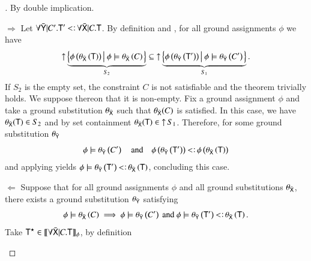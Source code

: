 \documentclass{report}
\begin{document}
  \begin{proof}[]
    By double implication.
    \begin{indcase}{$\Rightarrow$}
      Let $\forall\bar{\type{Y}}|C'.\type{T}'\subtype\forall\bar{\type{X}}|C.\type{T}$.
      By definition  and , for all
      ground assignments $\phi$ we have
      \begin{displaymath}
        \mathop{\rm\uparrow}\nolimits\underbrace{\left\{{\phi\left({\theta_{\bar{\textsf{X}}}\left({\textsf{T}}\right)}\right)}\left|\ {\phi\models\theta_{\bar{\textsf{X}}}\left({C}\right)}\right.\right\}}_{S_2}\subseteq
        \mathop{\rm\uparrow}\nolimits\underbrace{\left\{{\phi\left({\theta_{\bar{\textsf{Y}}}\left({\textsf{T}'}\right)}\right)}\left|\ {\phi\models\theta_{\bar{\textsf{Y}}}\left({C'}\right)}\right.\right\}}_{S_1}\textrm{.}
      \end{displaymath}
      If $S_2$ is the empty set, the constraint $C$ is not satisfiable and the theorem trivially
      holds. We suppose thereon that it is non-empty.
      Fix a ground assignment $\phi$ and take a ground substitution $\theta_{\bar{\textsf{X}}}$
      such that $\theta_{\bar{\textsf{X}}}(C)$ is satisfied. In this case, we have
      $\theta_{\bar{\textsf{X}}}(\textsf{T})\in S_2$ and by set containment
      $\theta_{\bar{\textsf{X}}}(\textsf{T})\in \mathop{\rm\uparrow}\nolimits S_1$. Therefore, for some
      ground substitution $\theta_{\bar{\textsf{Y}}}$
      \begin{displaymath}
        \phi\csat\theta_{\bar{\type{Y}}}\lrp{C'}\quad\textrm{and}\quad
        \phi\lrp{\theta_{\bar{\type{Y}}}\lrp{\type{T}'}}\subtype\phi\lrp{\theta_{\bar{\type{X}}}\lrp{\type{T}}}
      \end{displaymath}
      and applying \csub yields
      $\phi\csat\theta_{\bar{\type{Y}}}\lrp{\type{T}'}\subtype\theta_{\bar{\type{X}}}\lrp{\type{T}}$, concluding this case.
    \end{indcase}
    \begin{indcase}{$\Leftarrow$}
      Suppose that for all ground assignments $\phi$ and all ground substitutions $\theta_{\bar{\textsf{X}}}$, there
      exists a ground substitution $\theta_{\bar{\textsf{Y}}}$ satisfying
      \begin{displaymath}
        \phi\csat\theta_{\bar{\type{X}}}\lrp{C} \implies
        \phi\csat\theta_{\bar{\type{Y}}}\lrp{C'}\textrm{ and }
        \phi\csat\theta_{\bar{\type{Y}}}\lrp{\type{T}'}\subtype\theta_{\bar{\type{X}}}\lrp{\type{T}}\textrm{.}
      \end{displaymath}
      Take $\textsf{T}^\star\in\llbracket{\forall\bar{\textsf{X}}|C.\textsf{T}}\rrbracket_{\phi}$, by definition 

\end{indcase}
\end{proof}
\end{document}

